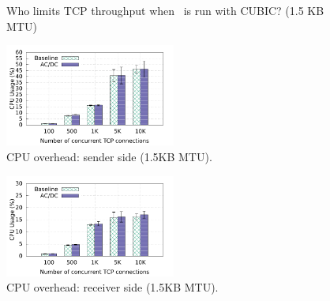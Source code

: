 \begin{figure}[!t]
        \caption{Who limits TCP throughput when~\acdc{} is run with CUBIC? (1.5 KB MTU)}
        \label{who_limits_compare_cwnd_rwnd}
\end{figure}

\begin{figure}[!t]
        \centering
  \includegraphics[width=0.5\textwidth]{acdctcp/figures/overhead/sender_15k_compare_cpu_witherrbar.pdf}
        \caption{CPU overhead: sender side (1.5KB MTU).}
        \label{cpu_overhead_sender_15k}
\end{figure}

\begin{figure}[!t]
        \centering
  \includegraphics[width=0.5\textwidth]{acdctcp/figures/overhead/receiver_15k_compare_cpu_witherrbar.pdf}
        \caption{CPU overhead: receiver side (1.5KB MTU).}
        \label{cpu_overhead_receiver_15k}
\end{figure}


